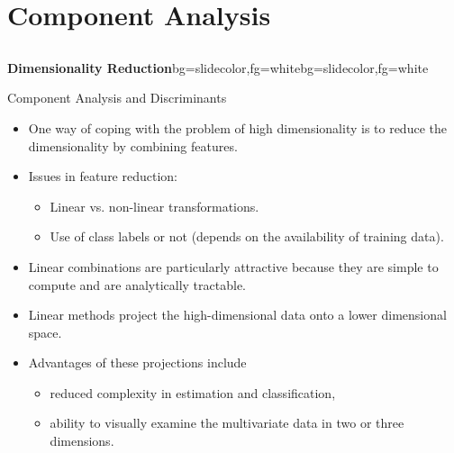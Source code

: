 \section{Component Analysis}
\subsection{}
\begin{frame}{}
\begin{variableblock}{\centering \Large \textbf{\vspace{4pt}\newline Dimensionality Reduction\vspace{4pt}}}{bg=slidecolor,fg=white}{bg=slidecolor,fg=white}
\end{variableblock}
\end{frame}

\begin{frame}{Component Analysis and Discriminants}
\begin{itemize}
\item One way of coping with the problem of high dimensionality
is to reduce the dimensionality by combining features.
\item Issues in feature reduction:
\begin{itemize}
\item Linear vs. non-linear transformations.
\item Use of class labels or not (depends on the availability of
training data).
\end{itemize}
\item Linear combinations are particularly attractive because they
are simple to compute and are analytically tractable.
\item Linear methods project the high-dimensional data onto a
lower dimensional space.
\item Advantages of these projections include
\begin{itemize}
\item reduced complexity in estimation and classification,
\item ability to visually examine the multivariate data in two or three dimensions.
\end{itemize}
\end{itemize}
\end{frame}

